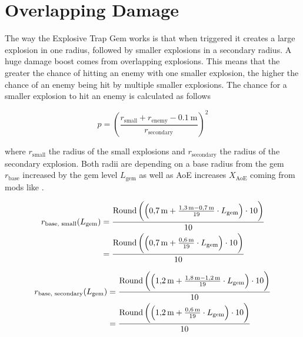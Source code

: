 \section{Overlapping Damage}
The way the Explosive Trap Gem works is that when triggered it creates a large explosion in one radius, followed by smaller explosions in a secondary radius. A huge damage boost comes from overlapping explosions. This means that the greater the chance of hitting an enemy with one smaller explosion, the higher the chance of an enemy being hit by multiple smaller explosions. The chance for a smaller explosion to hit an enemy is calculated as follows

\begin{equation}
	p = \left(\frac{r_\text{small} + r_\text{enemy} - \SI{0.1}{\meter}}{r_\text{secondary}}\right)^2
\end{equation}

where $r_\text{small}$ the radius of the small explosions and $r_\text{secondary}$ the radius of the secondary explosion. Both radii are depending on a base radius from the gem $r_\text{base}$ increased by the gem level $L_\text{gem}$ as well as AoE increases $X_\text{AoE}$ coming from mods like .

\begin{align}
	r_\text{base, small}(L_\text{gem}) &= \frac{\text{Round}\left(\left(\SI{0.7}{\meter} + \frac{\SI{1.3}{\meter} - \SI{0.7}{\meter}}{19}\cdot L_\text{gem}\right)\cdot 10\right)}{10}\\
	&= \frac{\text{Round}\left(\left(\SI{0.7}{\meter} + \frac{\SI{0.6}{\meter}}{19}\cdot L_\text{gem}\right)\cdot 10\right)}{10}
\end{align}

\begin{align}
	r_\text{base, secondary}(L_\text{gem}) &= \frac{\text{Round}\left(\left(\SI{1.2}{\meter} + \frac{\SI{1.8}{\meter} - \SI{1.2}{\meter}}{19}\cdot L_\text{gem}\right)\cdot 10\right)}{10}\\
	&= \frac{\text{Round}\left(\left(\SI{1.2}{\meter} + \frac{\SI{0.6}{\meter}}{19}\cdot L_\text{gem}\right)\cdot 10\right)}{10}
\end{align}



